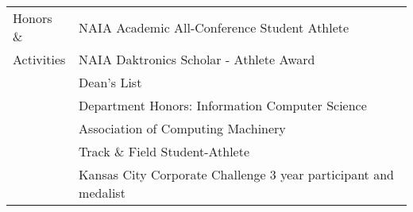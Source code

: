 \documentclass[12pt, arial]{article}
\begin{document}
\begin{tabular}{p{1.9cm} l}
Honors \&	& NAIA Academic All-Conference Student Athlete 						\\
Activities	& NAIA Daktronics Scholar - Athlete Award							\\
			& Dean's List 														\\
			& Department Honors: Information Computer Science					\\ 
			& Association of Computing Machinery 								\\
			& Track \& Field Student-Athlete 									\\
			& Kansas City Corporate Challenge 3 year participant and medalist 	\\
\end{tabular}
\end{document}
